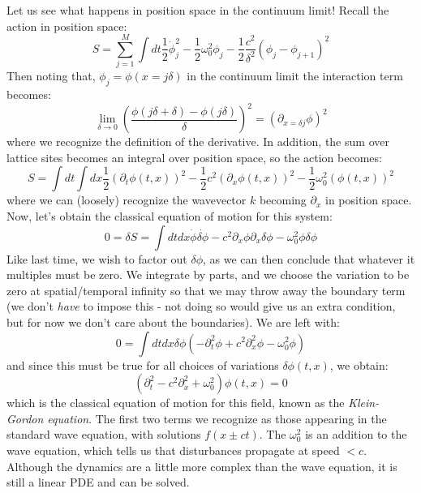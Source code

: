 Let us see what happens in position space in the continuum limit! Recall the action in position space:
\begin{equation}
    S = \sum_{j=1}^M \int dt \frac{1}{2}\dot{\phi}_j^2 - \frac{1}{2}\omega_0^2\phi_j - \frac{1}{2}\frac{c^2}{\delta^2}\left(\phi_j - \phi_{j+1}\right)^2
\end{equation}
Then noting that, $\phi_j = \phi(x = j\delta)$ in the continuum limit the interaction term becomes:
\begin{equation}
    \lim_{\delta \to 0} \left(\frac{\phi(j\delta + \delta) - \phi(j\delta)}{\delta}\right)^2 = (\partial_{x=\delta j} \phi)^2
\end{equation}
where we recognize the definition of the derivative. In addition, the sum over lattice sites becomes an integral over position space, so the action becomes:
\begin{equation}
    S = \int dt \int dx \frac{1}{2}(\partial_t \phi(t, x))^2 - \frac{1}{2}c^2(\partial_x \phi(t, x))^2 - \frac{1}{2}\omega_0^2(\phi(t, x))^2
\end{equation}
where we can (loosely) recognize the wavevector $k$ becoming $\partial_x$ in position space. Now, let's obtain the classical equation of motion for this system:
\begin{equation}
    0 = \delta S = \int dtdx \dot{\phi}\dot{\delta \phi} - c^2 \partial_x \phi \partial_x \delta \phi - \omega_0^2 \phi \delta \phi
\end{equation}
Like last time, we wish to factor out $\delta \phi$, as we can then conclude that whatever it multiples must be zero. We integrate by parts, and we choose the variation to be zero at spatial/temporal infinity so that we may throw away the boundary term (we don't \emph{have} to impose this - not doing so would give us an extra condition, but for now we don't care about the boundaries). We are left with:
\begin{equation}
    0 = \int dt dx \delta \phi(-\partial_t^2\phi + c^2\partial_x^2 \phi - \omega_0^2 \phi)
\end{equation}
and since this must be true for all choices of variations $\delta \phi(t, x)$, we obtain:
\begin{equation}
    \boxed{(\partial_t^2 - c^2\partial_x^2 + \omega_0^2)\phi(t, x) = 0}
\end{equation}
which is the classical equation of motion for this field, known as the \emph{Klein-Gordon equation}. The first two terms we recognize as those appearing in the standard wave equation, with solutions $f(x \pm ct)$. The $\omega_0^2$ is an addition to the wave equation, which tells us that disturbances propagate at speed $< c$. Although the dynamics are a little more complex than the wave equation, it is still a linear PDE and can be solved.

